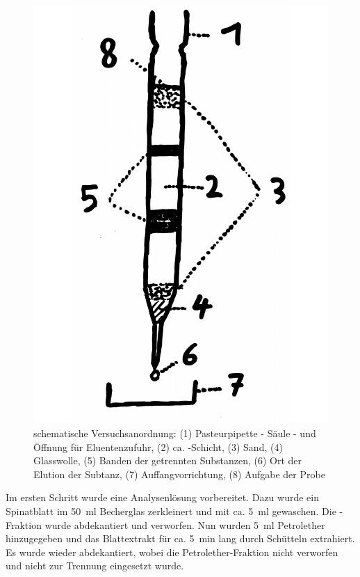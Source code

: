 \documentclass{article}
\begin{document}
        \begin{figure}[H]
          \includegraphics[scale=0.08, center]{Graphiken/Versuchsanordnungen/VersuchsanordnungSC.png} 
          \caption[schematische Versuchsanordnung Säulenchromatographie, Quelle: Autor]{schematische Versuchsanordnung: (1) Pasteurpipette - Säule - und Öffnung für Eluentenzufuhr, (2) ca. -Schicht, (3) Sand, (4) Glasswolle, (5) Banden der getrennten Substanzen, (6) Ort der Elution der Subtanz, (7) Auffangvorrichtung, (8) Aufgabe der Probe}
          \label{fig:Versuchsanordnungzwei}
        \end{figure}
        
        Im ersten Schritt wurde eine Analysenlösung vorbereitet. Dazu wurde ein Spinatblatt im \SI[mode=text,separate-uncertainty=true]{50}{\milli\litre} Becherglas zerkleinert und mit ca. \SI[mode=text]{5}{\milli\litre}  gewaschen. Die -Fraktion wurde abdekantiert und verworfen. Nun wurden \SI[mode=text]{5}{\milli\litre} Petrolether hinzugegeben und das Blattextrakt für ca. \SI[mode=text]{5}{\minute} lang durch Schütteln extrahiert. Es wurde wieder abdekantiert, wobei die Petrolether-Fraktion nicht verworfen und nicht zur Trennung eingesetzt wurde. 
        
\end{document}
